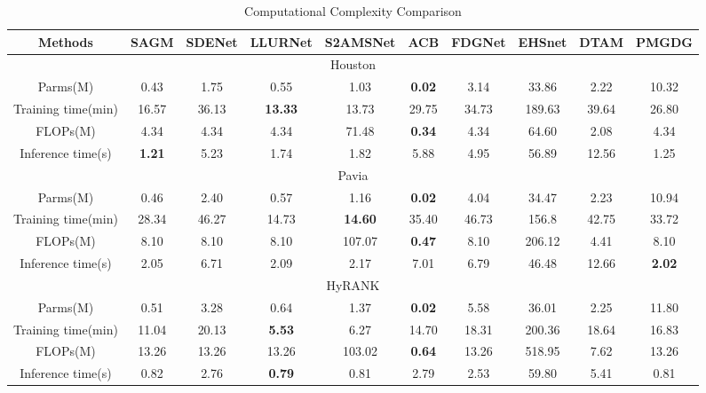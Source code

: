\begin{table}[t]
\centering
\caption{Computational Complexity Comparison}
\label{tab:complexity}
\begin{tabular}{|c|c|c|c|c|c|c|c|c|c|}
\hline
Methods & SAGM & SDENet & LLURNet & S2AMSNet & ACB & FDGNet & EHSnet & DTAM & PMGDG \\
\hline
\multicolumn{10}{|c|}{Houston} \\
\hline
Parms(M) & 0.43 & 1.75 & 0.55 & 1.03 & \textbf{0.02} & 3.14 & 33.86 & 2.22 & 10.32 \\
\hline
Training time(min) & 16.57 & 36.13 & \textbf{13.33} & 13.73 & 29.75 & 34.73 & 189.63 & 39.64 & 26.80 \\
\hline
FLOPs(M) & 4.34 & 4.34 & 4.34 & 71.48 & \textbf{0.34} & 4.34 & 64.60 & 2.08 & 4.34 \\
\hline
Inference time(s) & \textbf{1.21} & 5.23 & 1.74 & 1.82 & 5.88 & 4.95 & 56.89 & 12.56 & 1.25 \\
\hline
\multicolumn{10}{|c|}{Pavia} \\
\hline
Parms(M) & 0.46 & 2.40 & 0.57 & 1.16 & \textbf{0.02} & 4.04 & 34.47 & 2.23 & 10.94 \\
\hline
Training time(min) & 28.34 & 46.27 & 14.73 & \textbf{14.60} & 35.40 & 46.73 & 156.8 & 42.75 & 33.72 \\
\hline
FLOPs(M) & 8.10 & 8.10 & 8.10 & 107.07 & \textbf{0.47} & 8.10 & 206.12 & 4.41 & 8.10 \\
\hline
Inference time(s) & 2.05 & 6.71 & 2.09 & 2.17 & 7.01 & 6.79 & 46.48 & 12.66 & \textbf{2.02} \\
\hline
\multicolumn{10}{|c|}{HyRANK} \\
\hline
Parms(M) & 0.51 & 3.28 & 0.64 & 1.37 & \textbf{0.02} & 5.58 & 36.01 & 2.25 & 11.80 \\
\hline
Training time(min) & 11.04 & 20.13 & \textbf{5.53} & 6.27 & 14.70 & 18.31 & 200.36 & 18.64 & 16.83 \\
\hline
FLOPs(M) & 13.26 & 13.26 & 13.26 & 103.02 & \textbf{0.64} & 13.26 & 518.95 & 7.62 & 13.26 \\
\hline
Inference time(s) & 0.82 & 2.76 & \textbf{0.79} & 0.81 & 2.79 & 2.53 & 59.80 & 5.41 & 0.81 \\
\hline
\end{tabular}
\end{table}

\clearpage

